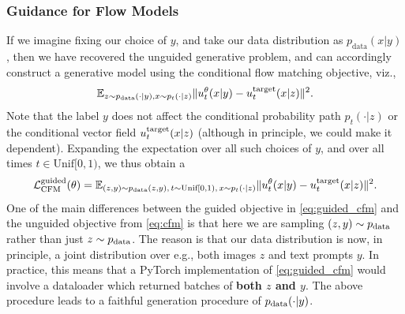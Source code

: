 \subsubsection{Guidance for Flow Models}
If we imagine fixing our choice of $y$, and take our data distribution as $p_{\text{data}}(x|y)$, then we have recovered the unguided generative problem, and can accordingly construct a generative model using the conditional flow matching objective, viz.,
\begin{equation}
    \mathbb{E}_{z \sim p_{\text{data}}(\cdot|y), x \sim p_t(\cdot|z)} \lVert u_t^{\theta}(x|y) - u^{\text{target}}_t(x|z)\rVert^2.
\end{equation}
Note that the label $y$ does not affect the conditional probability path $p_t(\cdot|z)$ or the conditional vector field $u^{\text{target}}_t(x|z)$ (although in principle, we could make it dependent). %
Expanding the expectation over all such choices of $y$, and over all times $t \in \text{Unif}[0,1)$, we thus obtain a 
\begin{equation}
    \label{eq:guided_cfm}
    \mathcal{L}_{\text{CFM}}^{\text{guided}}(\theta) = \mathbb{E}_{(z,y) \sim p_{\text{data}}(z,y),\,t\sim \text{Unif}[0,1),\,x\sim p_t(\cdot|z)} \lVert u_t^{\theta}(x|y) - u^{\text{target}}_t(x|z)\rVert^2.
\end{equation}
One of the main differences between the guided objective in \cref{eq:guided_cfm} and the unguided objective from \cref{eq:cfm} is that here we are sampling $(z,y) \sim p_{\rm{data}}$ rather than just $z \sim p_{\rm{data}}$. The reason is that our data distribution is now, in principle, a joint distribution over e.g., both images $z$ and text prompts $y$. In practice, this means that a PyTorch implementation of \cref{eq:guided_cfm} would involve a dataloader which returned batches of \textbf{both $z$ and $y$}. The above procedure leads to a faithful generation procedure of $p_{\rm{data}}(\cdot|y)$.

